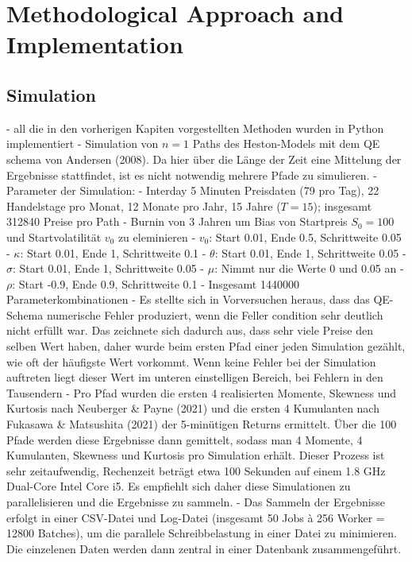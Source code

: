 \section{Methodological Approach and Implementation}

\subsection{Simulation}
- all die in den vorherigen Kapiten vorgestellten Methoden wurden in Python implementiert
- Simulation von $n=1$ Paths des Heston-Models mit dem QE schema von Andersen (2008). Da hier über die Länge der Zeit eine Mittelung der Ergebnisse stattfindet, ist es nicht notwendig mehrere Pfade zu simulieren.
- Parameter der Simulation:
    - Interday 5 Minuten Preisdaten (79 pro Tag), 22 Handelstage pro Monat, 12 Monate pro Jahr, 15 Jahre ($T = 15$); insgesamt 312840 Preise pro Path
    - Burnin von 3 Jahren um Bias von Startpreis $S_0 = 100$ und Startvolatilität $v_0$ zu eleminieren
    - $v_0$: Start 0.01, Ende 0.5, Schrittweite 0.05
    - $\kappa$: Start 0.01, Ende 1, Schrittweite 0.1
    - $\theta$: Start 0.01, Ende 1, Schrittweite 0.05
    - $\sigma$: Start 0.01, Ende 1, Schrittweite 0.05
    - $\mu$: Nimmt nur die Werte 0 und 0.05 an
    - $\rho$: Start -0.9, Ende 0.9, Schrittweite 0.1
    - Insgesamt 1440000 Parameterkombinationen
- Es stellte sich in Vorversuchen heraus, dass das QE-Schema numerische Fehler produziert, wenn die Feller condition sehr deutlich nicht erfüllt war. Das zeichnete sich dadurch aus, dass sehr viele Preise den selben Wert haben, daher wurde beim ersten Pfad einer jeden Simulation gezählt, wie oft der häufigste Wert vorkommt. Wenn keine Fehler bei der Simulation auftreten liegt dieser Wert im unteren einstelligen Bereich, bei Fehlern in den Tausendern %
- Pro Pfad wurden die ersten 4 realisierten Momente, Skewness und Kurtosis nach Neuberger & Payne (2021) und die ersten 4 Kumulanten nach Fukasawa & Matsushita (2021) der 5-minütigen Returns ermittelt. Über die 100 Pfade werden diese Ergebnisse dann gemittelt, sodass man 4 Momente, 4 Kumulanten, Skewness und Kurtosis pro Simulation erhält. Dieser Prozess ist sehr zeitaufwendig, Rechenzeit beträgt etwa 100 Sekunden auf einem 1.8 GHz Dual-Core Intel Core i5. Es empfiehlt sich daher diese Simulationen zu parallelisieren und die Ergebnisse zu sammeln.
- Das Sammeln der Ergebnisse erfolgt in einer CSV-Datei und Log-Datei (insgesamt 50 Jobs à 256 Worker = 12800 Batches), um die parallele Schreibbelastung in einer Datei zu minimieren. Die einzelenen Daten werden dann zentral in einer Datenbank zusammengeführt.

